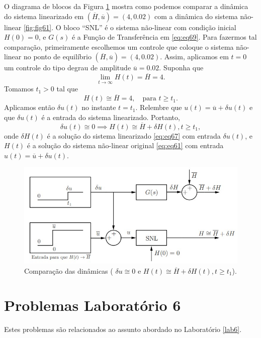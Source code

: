 \documentclass[
]{book}
\theoremstyle{definition}
\theoremstyle{definition}
\theoremstyle{definition}
\theoremstyle{remark}
\begin{document}
O diagrama de blocos da Figura \ref{fig:fig63} mostra como podemos comparar a dinâmica do sistema linearizado em \((\overline{H}, \overline{u}) = (4, 0.02)\) com a dinâmica do sistema não-linear \ref{fig:fig61}. O bloco ``SNL'' é o sistema não-linear com condição inicial \(H(0) = 0\), e \(G(s)\) é a Função de Transferência em \eqref{eq:eq69}. Para fazermos tal comparação, primeiramente escolhemos um controle que coloque o sistema não-linear no ponto de equilíbrio \((\overline{H}, \overline{u}) = (4, 0.02)\). Assim, aplicamos em \(t = 0\) um controle do tipo degrau de amplitude \(\overline{u} = 0.02\). Suponha que
\[
\lim\limits_{t\to\infty}{H(t)}  = \overline{H} =4.
\]
Tomamos \(t_1 > 0\) tal que
\[
H(t) \cong \overline{H} = 4, \quad \text{para } t\geq t_1. \label{eq:eq610}
\]
Aplicamos então \(\delta u(t)\) no instante \(t = t_1\). Relembre que \(u(t) = \overline{u} + \delta u(t)\) e que \(\delta u(t)\) é a entrada do sistema linearizado. Portanto,
\[
\boxed{\delta u(t) \cong 0 \implies H(t) \cong \overline{H} + \delta H(t), t \geq t_1},
\]
onde \(\delta H(t)\) é a solução do sistema linearizado \eqref{eq:eq67} com entrada \(\delta u(t)\), e \(H(t)\) é a solução do sistema não-linear original \eqref{eq:eq61} com entrada \(u(t) = \overline{u} + \delta u(t)\).

\begin{figure}

{\centering \includegraphics[width=0.5\linewidth]{Imagens/Lab6/Apresentação/fig3} 

}

\caption{Comparação das dinâmicas ( $\delta u \cong 0$ e $H(t) \cong \overline{H} + \delta H(t), t \geq t_1$).}\label{fig:fig63}
\end{figure}

\hypertarget{problemas-laboratuxf3rio-6}{%
\chapter*{Problemas Laboratório 6}\label{problemas-laboratuxf3rio-6}}

Estes problemas são relacionados ao assunto abordado no Laboratório \ref{lab6}.
\end{document}

